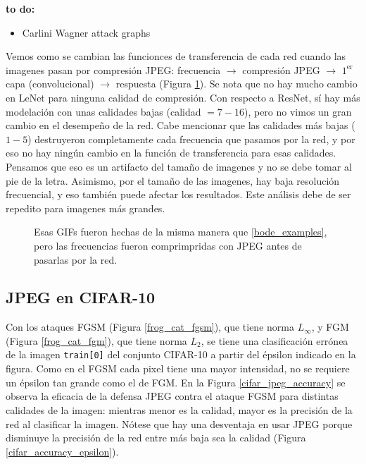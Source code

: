 {\LARGE \textbf{to do:}}
\begin{itemize}
    \item Carlini Wagner attack graphs
\end{itemize}

Vemos como se cambian las funcionces de transferencia de cada red cuando las imagenes pasan por compresión JPEG: frecuencia $\to$ compresión JPEG $\to$ $1^\text{er}$ capa (convolucional) $\to$ respuesta (Figura \ref{bode_gifs}). Se nota que no hay mucho cambio en LeNet para ninguna calidad de compresión. Con respecto a ResNet, sí hay más modelación con unas calidades bajas (calidad $= 7-16$), pero no vimos un gran cambio en el desempeño de la red. Cabe mencionar que las calidades más bajas ($1-5$) destruyeron completamente cada frecuencia que pasamos por la red, y por eso no hay ningún cambio en la función de transferencia para esas calidades. Pensamos que eso es un artifacto del tamaño de imagenes y no se debe tomar al pie de la letra. Asimismo, por el tamaño de las imagenes, hay baja resolución frecuencial, y eso también puede afectar los resultados. Este análisis debe de ser repedito para imagenes más grandes.
\begin{figure}[h]
    \caption{Esas GIFs fueron hechas de la misma manera que \ref{bode_examples}, pero las frecuencias fueron comprimpridas con JPEG antes de pasarlas por la red. }
    \label{bode_gifs}
\end{figure}

\subsection{JPEG en CIFAR-10}

Con los ataques FGSM (Figura \ref{frog_cat_fgsm}), que tiene norma $L_\infty$, y FGM (Figura \ref{frog_cat_fgm}), que tiene norma $L_2$, se tiene una clasificación errónea de la imagen \texttt{train[0]} del conjunto CIFAR-10 a partir del épsilon indicado en la figura. Como en el FGSM cada pixel tiene una mayor intensidad, no se requiere un épsilon tan grande como el de FGM. En la Figura \ref{cifar_jpeg_accuracy} se observa la eficacia de la defensa JPEG contra el ataque FGSM para distintas calidades de la imagen: mientras menor es la calidad, mayor es la precisión de la red al clasificar la imagen. Nótese que hay una desventaja en usar JPEG porque disminuye la precisión de la red entre más baja sea la calidad (Figura \ref{cifar_accuracy_epsilon}).




